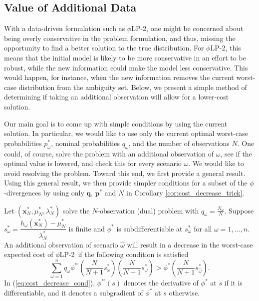 \documentclass[opre,nonblindrev]{informs3} %
\newcommand{\x}{\mathbf{x}}
\newcommand{\q}{\mathbf{q}}
\newcommand{\p}{\mathbf{p}}
\newcommand{\plp}{$\phi$LP-2}
\begin{document}
\subsection{Value of Additional Data} \label{ssec:value}

With a data-driven formulation such as \plp, 
one might be concerned about being overly conservative in the problem formulation, and thus, missing the opportunity to find a better solution to the true distribution.
For \plp, this means that the initial model is likely to be more conservative in an effort to be robust, while the new information could make the model less conservative.
This would happen, for instance, when the new information removes the current worst-case distribution from the ambiguity set.  
Below, we present a simple method of determining if taking an additional observation will allow for a lower-cost solution.

Our main goal is to come up with simple conditions by using the current solution.
In particular, we would like to use only the current optimal worst-case probabilities $p_\omega^*$, nominal probabilities $q_\omega$, and the number of observations $N$.
One could, of course, solve the problem with an additional observation of $\omega$, see if the optimal value is lowered, and check this for every scenario $\omega$. 
We would like to avoid resolving the problem. 
Toward this end, we first provide a general result. 
Using this general result, we then provide simpler conditions for a subset of the $\phi$-divergences by using only $\q$, $\p^*$ and $N$ in Corollary \ref{cor:cost_decrease_trick}. 

\begin{proposition}
	\label{prop:value}
	Let $(\x^*_N,\mu^*_N,\lambda^*_N)$ solve the $N$-observation (dual) problem with $q_\omega = \tfrac{N_\omega}{N}$.
	Suppose $s^*_\omega = \dfrac{h_\omega(\x^*_N) - \mu^*_N}{\lambda^*_N}$ is finite and $\phi^*$ is subdifferentiable at $s^*_\omega $ for all $\omega=1,\ldots,n$.
	An additional observation of scenario $\hat{\omega}$ will result in a decrease in the worst-case expected cost of \plp\ if the following condition is satisfied
	\begin{equation} \label{eq:cost_decrease_cond}
		\sum_{\omega=1}^n q_\omega \phi^{*\prime}\left(\frac{N}{N+1}s^*_\omega\right) \left(\frac{N}{N+1}s^*_\omega\right) > \phi^*\left(\frac{N}{N+1}s^*_{\hat{\omega}}\right).
	\end{equation}
	In (\ref{eq:cost_decrease_cond}), $\phi^{*\prime}(s)$ denotes the derivative of $\phi^{*}$ at $s$ if it is differentiable, and it denotes a subgradient of $\phi^{*}$ at $s$ otherwise. 
\end{proposition}
\end{document}
